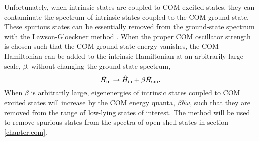 \documentclass[thesis.tex]{subfiles}
\begin{document}
Unfortunately, when intrinsic states are coupled to COM excited-states, they can contaminate the spectrum of intrinsic states coupled to the COM ground-state.  These spurious states can be essentially removed from the ground-state spectrum with the Lawson-Gloeckner method \cite{GLOECKNER1974313}.  When the proper COM oscillator strength is chosen such that the COM ground-state energy vanishes, the COM Hamiltonian can be added to the intrinsic Hamiltonian at an arbitrarily large scale, $\beta$, without changing the ground-state spectrum,
\begin{equation} \label{eq:lawson-term}
  \hat{H}\hspace{-1pt}_{\mathrm{in}} \rightarrow \hat{H}\hspace{-1pt}_{\mathrm{in}} + \beta\hat{H}\hspace{-1pt}_{\mathrm{cm}}.
\end{equation}
When $\beta$ is arbitrarily large, eigenenergies of intrinsic states coupled to COM excited states will increase by the COM energy quanta, $\beta\hbar\widetilde{\omega}$, such that they are removed from the range of low-lying states of interest.  The method will be used to remove spurious states from the spectra of open-shell states in section \ref{chapter:eom}.
  
\end{document}

